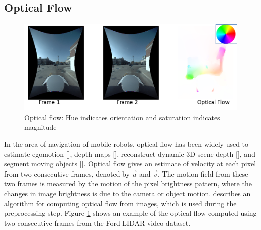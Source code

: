 \documentclass{article}
\begin{document}

\subsection{Optical Flow} %
\label{sub:optical_flow}

\begin{figure}[htbp]
    \centering
        \includegraphics[scale=0.85]{Figures/OpticalFlow_example_final.png}
    \caption{Optical flow: Hue indicates orientation and saturation indicates magnitude}
    \label{fig:Figures_OptFlow placeholder}
\end{figure}

In the area of navigation of mobile robots, optical flow has been widely used to estimate egomotion [\cite{Prazdny1980-egomotion-OF}], depth maps [\cite{Shahraray1988-depthestimation-OF}], reconstruct dynamic 3D scene depth [\cite{Yang2012-reconstruction-OF}], and segment moving objects [\cite{Shao2002-seg-OF}]. Optical flow gives an estimate of velocity at each pixel from two consecutive frames, denoted by $\vec{u}$ and $\vec{v}$. The motion field from these two frames is measured by the motion of the pixel brightness pattern, where the changes in image brightness is due to the camera or object motion. \cite{Liu2009Beyond-Pix} describes an algorithm for computing optical flow from images, which is used during the preprocessing step. Figure \ref{fig:Figures_OptFlow placeholder} shows an example of the optical flow computed using two consecutive frames from the Ford LIDAR-video dataset.


\end{document}

